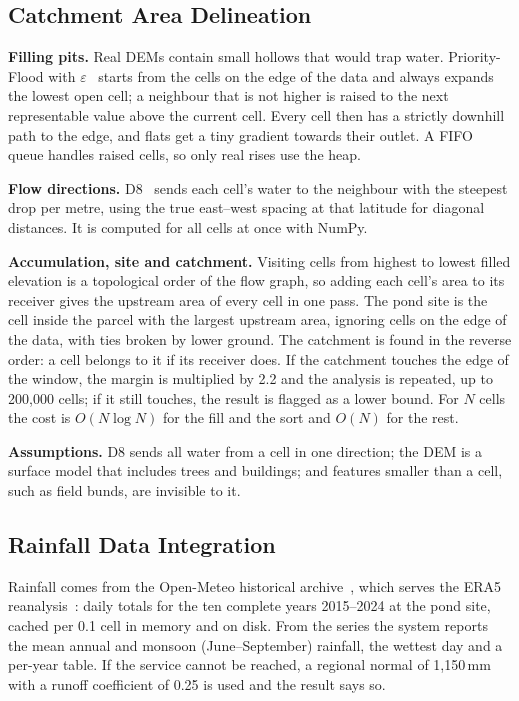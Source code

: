 \documentclass[manuscript,screen,review]{acmart}
\begin{document}
\subsection{Catchment Area Delineation}
\textbf{Filling pits.} Real DEMs contain small hollows that would trap water. Priority-Flood
with $\varepsilon$~\cite{barnes2014priority} starts from the cells on the edge of the data and
always expands the lowest open cell; a neighbour that is not higher is raised to the next
representable value above the current cell. Every cell then has a strictly downhill path to the
edge, and flats get a tiny gradient towards their outlet. A FIFO queue handles raised cells, so
only real rises use the heap.

\textbf{Flow directions.} D8~\cite{ocallaghan1984d8} sends each cell's water to the neighbour with
the steepest drop per metre, using the true east--west spacing at that latitude for diagonal
distances. It is computed for all cells at once with NumPy.

\textbf{Accumulation, site and catchment.} Visiting cells from highest to lowest filled elevation
is a topological order of the flow graph, so adding each cell's area to its receiver gives the
upstream area of every cell in one pass. The pond site is the cell inside the parcel with the
largest upstream area, ignoring cells on the edge of the data, with ties broken by lower ground.
The catchment is found in the reverse order: a cell belongs to it if its receiver does. If the
catchment touches the edge of the window, the margin is multiplied by 2.2 and the analysis is
repeated, up to 200{,}000 cells; if it still touches, the result is flagged as a lower bound. For
$N$ cells the cost is $O(N\log N)$ for the fill and the sort and $O(N)$ for the rest.

\textbf{Assumptions.} D8 sends all water from a cell in one direction; the DEM is a surface model
that includes trees and buildings; and features smaller than a cell, such as field bunds, are
invisible to it.

\subsection{Rainfall Data Integration}
Rainfall comes from the Open-Meteo historical archive~\cite{openmeteo}, which serves the ERA5
reanalysis~\cite{hersbach2020era5}: daily totals for the ten complete years 2015--2024 at the pond
site, cached per 0.1\textdegree{} cell in memory and on disk. From the series the system reports
the mean annual and monsoon (June--September) rainfall, the wettest day and a per-year table. If
the service cannot be reached, a regional normal of 1{,}150\,mm with a runoff coefficient of 0.25
is used and the result says so.
\end{document}
